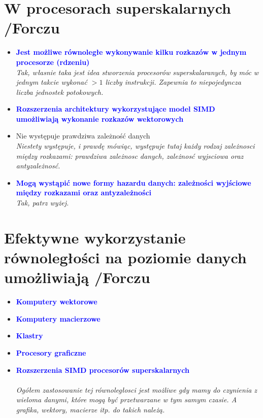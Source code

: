\section{W procesorach superskalarnych {\small /Forczu}}
	\begin{itemize}
    \item \textcolor{Blue}{\textbf{Jest możliwe równoległe wykonywanie kilku rozkazów w jednym procesorze (rdzeniu)}}\\
    {\small \emph{Tak, własnie taka jest idea stworzenia procesorów superskalaranych, by móc w jednym takcie wykonać $>1$ liczby instrukcji. Zapewnia to niepojedyncza liczba jednostek potokowych.}}
    \item \textcolor{Blue}{\textbf{Rozszerzenia architektury wykorzystujące model SIMD umożliwiają wykonanie rozkazów wektorowych}}
    \item Nie występuje prawdziwa zależność danych\\
    {\small \emph{Niestety występuje, i prawdę mówiąc, występuje tutaj każdy rodzaj zależnosci między rozkazami: prawdziwa zależnosc danych, zależnosć wyjsciowa oraz antyzależnosć.}}
    \item \textcolor{Blue}{\textbf{Mogą wystąpić nowe formy hazardu danych: zależności wyjściowe między rozkazami oraz antyzależności}}\\
    {\small \emph{Tak, patrz wyżej.}}
    \end{itemize}

\section{Efektywne wykorzystanie równoległości na poziomie danych umożliwiają {\small /Forczu}}
	\begin{itemize}
    \item \textcolor{Blue}{\textbf{Komputery wektorowe}}
    \item \textcolor{Blue}{\textbf{Komputery macierzowe}}
    \item \textcolor{Blue}{\textbf{Klastry}}
    \item \textcolor{Blue}{\textbf{Procesory graficzne}}
    \item \textcolor{Blue}{\textbf{Rozszerzenia SIMD procesorów superskalarnych}}\\\\
    {\small \emph{Ogółem zastosowanie tej równoległosci jest możliwe gdy mamy do czynienia z wieloma danymi, które mogą być przetwarzane w tym samym czasie. A grafika, wektory, macierze itp. do takich należą.}}
    \end{itemize}

